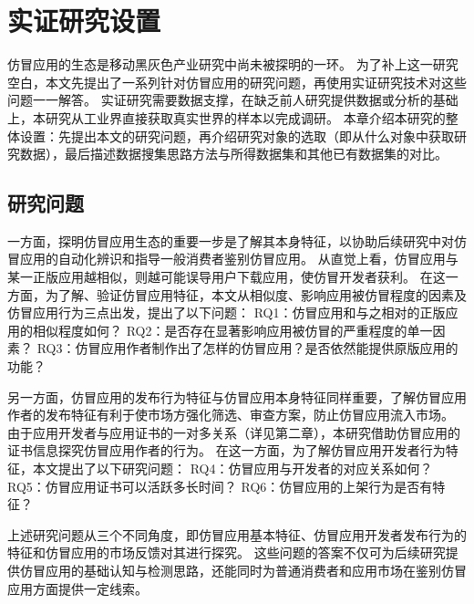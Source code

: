\chapter{实证研究设置}
\label{chp:data_description}

仿冒应用的生态是移动黑灰色产业研究中尚未被探明的一环。
为了补上这一研究空白，本文先提出了一系列针对仿冒应用的研究问题，再使用实证研究技术对这些问题一一解答。
实证研究需要数据支撑，在缺乏前人研究提供数据或分析的基础上，本研究从工业界直接获取真实世界的样本以完成调研。
本章介绍本研究的整体设置：先提出本文的研究问题，再介绍研究对象的选取（即从什么对象中获取研究数据），最后描述数据搜集思路方法与所得数据集和其他已有数据集的对比。


\section{研究问题}

一方面，探明仿冒应用生态的重要一步是了解其本身特征，以协助后续研究中对仿冒应用的自动化辨识和指导一般消费者鉴别仿冒应用。
从直觉上看，仿冒应用与某一正版应用越相似，则越可能误导用户下载应用，使仿冒开发者获利。
在这一方面，为了解、验证仿冒应用特征，本文从相似度、影响应用被仿冒程度的因素及仿冒应用行为三点出发，提出了以下问题：
RQ1：仿冒应用和与之相对的正版应用的相似程度如何？
RQ2：是否存在显著影响应用被仿冒的严重程度的单一因素？
RQ3：仿冒应用作者制作出了怎样的仿冒应用？是否依然能提供原版应用的功能？

另一方面，仿冒应用的发布行为特征与仿冒应用本身特征同样重要，了解仿冒应用作者的发布特征有利于使市场方强化筛选、审查方案，防止仿冒应用流入市场。
由于应用开发者与应用证书的一对多关系（详见第二章），本研究借助仿冒应用的证书信息探究仿冒应用作者的行为。
在这一方面，为了解仿冒应用开发者行为特征，本文提出了以下研究问题：
RQ4：仿冒应用与开发者的对应关系如何？
RQ5：仿冒应用证书可以活跃多长时间？
RQ6：仿冒应用的上架行为是否有特征？


上述研究问题从三个不同角度，即仿冒应用基本特征、仿冒应用开发者发布行为的特征和仿冒应用的市场反馈对其进行探究。
这些问题的答案不仅可为后续研究提供仿冒应用的基础认知与检测思路，还能同时为普通消费者和应用市场在鉴别仿冒应用方面提供一定线索。


